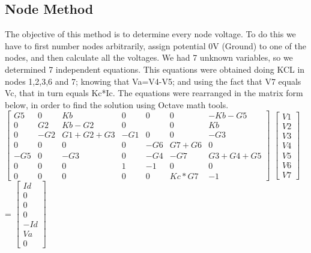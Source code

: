 \documentclass[11en, a4paper, oneside]{article}
\begin{document}
\subsection{Node Method}
The objective of this method is to determine every node voltage. To do this we have to first number nodes arbitrarily, assign potential 0V (Ground) to one of the nodes, and then calculate all the voltages. We had 7 unknown variables, so we determined 7 independent equations. This equations were obtained doing KCL in nodes 1,2,3,6 and 7; knowing that Va=V4-V5; and using the fact that V7 equals Vc, that in turn equals Kc*Ic. The equations were rearranged in the matrix form below, in order to find the solution using Octave math tools.\\


$\begin{bmatrix}
G5 & 0 & Kb & 0 & 0 & 0 & -Kb-G5\\
0 & G2 & Kb-G2 & 0 &  & 0 & Kb\\
0 & -G2 & G1+G2+G3 & -G1 & 0 & 0 & -G3\\
0 & 0 & 0 & 0 & -G6 & G7+G6 & 0\\
-G5 & 0 & -G3 & 0 & -G4 & -G7 & G3+G4+G5\\
0 & 0 & 0 & 1 & -1 & 0 & 0\\
0 & 0 & 0 & 0 & 0 & Kc*G7 & -1
\end{bmatrix}$
$\begin{bmatrix}
V1 \\ V2 \\ V3 \\ V4 \\ V5 \\ V6 \\ V7
\end{bmatrix}$
= 
$\begin{bmatrix}
Id \\ 0 \\ 0 \\ 0 \\ -Id \\ Va \\ 0
\end{bmatrix}$
 
\end{document}
